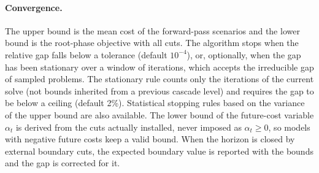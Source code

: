 \paragraph{Convergence.}
The upper bound is the mean cost of the forward-pass scenarios and the
lower bound is the root-phase objective with all cuts.  The algorithm
stops when the relative gap falls below a tolerance (default
$10^{-4}$), or, optionally, when the gap has been stationary over a
window of iterations, which accepts the irreducible gap of sampled
problems.  The stationary rule counts only the iterations of the
current solve (not bounds inherited from a previous cascade level) and
requires the gap to be below a ceiling (default 2\%).  Statistical
stopping rules based on the variance of the upper bound are also
available.  The lower bound of the future-cost variable $\alpha_t$ is
derived from the cuts actually installed, never imposed as
$\alpha_t \geq 0$, so models with negative future costs keep a valid
bound.  When the horizon is closed by external boundary cuts, the
expected boundary value is reported with the bounds and the gap is
corrected for it.


